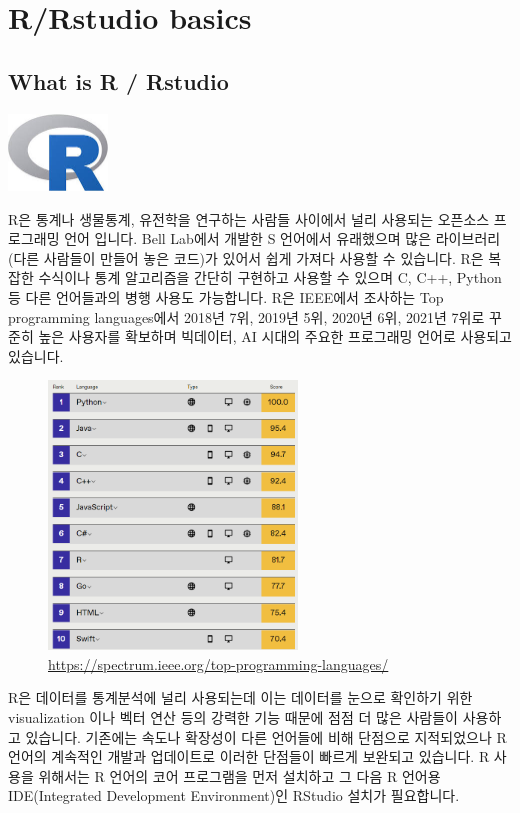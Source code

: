 \documentclass[
]{book}
\begin{document}
\hypertarget{rrstudio-basics}{%
\chapter{R/Rstudio basics}\label{rrstudio-basics}}

\hypertarget{what-is-r-rstudio}{%
\section{What is R / Rstudio}\label{what-is-r-rstudio}}

\includegraphics[width=1.04167in,height=\textheight]{images/01/r.jpg}

R은 통계나 생물통계, 유전학을 연구하는 사람들 사이에서 널리 사용되는 오픈소스 프로그래밍 언어 입니다. Bell Lab에서 개발한 S 언어에서 유래했으며 많은 라이브러리 (다른 사람들이 만들어 놓은 코드)가 있어서 쉽게 가져다 사용할 수 있습니다. R은 복잡한 수식이나 통계 알고리즘을 간단히 구현하고 사용할 수 있으며 C, C++, Python 등 다른 언어들과의 병행 사용도 가능합니다. R은 IEEE에서 조사하는 Top programming languages에서 2018년 7위, 2019년 5위, 2020년 6위, 2021년 7위로 꾸준히 높은 사용자를 확보하며 빅데이터, AI 시대의 주요한 프로그래밍 언어로 사용되고 있습니다.

\begin{figure}
\centering
\includegraphics[width=2.60417in,height=\textheight]{images/01/toplanguage2021.png}
\caption{\url{https://spectrum.ieee.org/top-programming-languages/}}
\end{figure}

R은 데이터를 통계분석에 널리 사용되는데 이는 데이터를 눈으로 확인하기 위한 visualization 이나 벡터 연산 등의 강력한 기능 때문에 점점 더 많은 사람들이 사용하고 있습니다. 기존에는 속도나 확장성이 다른 언어들에 비해 단점으로 지적되었으나 R 언어의 계속적인 개발과 업데이트로 이러한 단점들이 빠르게 보완되고 있습니다. R 사용을 위해서는 R 언어의 코어 프로그램을 먼저 설치하고 그 다음 R 언어용 IDE(Integrated Development Environment)인 RStudio 설치가 필요합니다.
\end{document}
